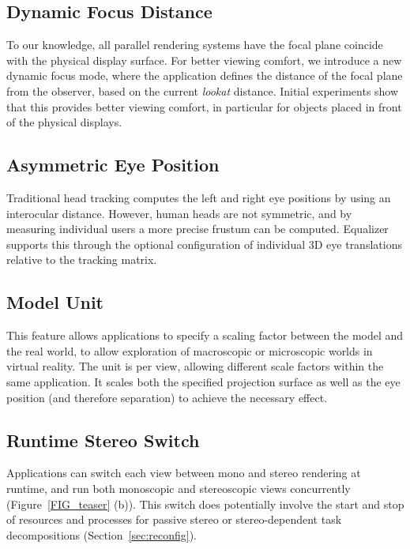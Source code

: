 \documentclass[10pt,journal,compsoc]{IEEEtran}
\newcommand{\sref}[1]{Section~\ref{#1}}
\newcommand{\fig}[1]{Figure~\ref{#1}}
\begin{document}
\subsection{Dynamic Focus Distance}

To our knowledge, all parallel rendering systems have the focal plane coincide
with the physical display surface. For better viewing comfort, we introduce a
new dynamic focus mode, where the application defines the distance of the focal
plane from the observer, based on the current \textit{lookat} distance. Initial
experiments show that this provides better viewing comfort, in particular for
objects placed in front of the physical displays.

\subsection{Asymmetric Eye Position}

Traditional head tracking computes the left and right eye positions by using an
interocular distance. However, human heads are not symmetric, and by measuring
individual users a more precise frustum can be computed. \textsf{Equalizer}
supports this through the optional configuration of individual 3D eye
translations relative to the tracking matrix.

\subsection{Model Unit}

This feature allows applications to specify a scaling factor between the model
and the real world, to allow exploration of macroscopic or microscopic worlds in
virtual reality. The unit is per view, allowing different scale factors within
the same application. It scales both the specified projection surface as well
as the eye position (and therefore separation) to achieve the necessary effect.

\subsection{Runtime Stereo Switch}

Applications can switch each view between mono and stereo rendering at runtime,
and run both monoscopic and stereoscopic views concurrently (\fig{FIG_teaser}
(b)). This switch does potentially involve the start and stop of resources and
processes for passive stereo or stereo-dependent task decompositions
(\sref{sec:reconfig}).
\end{document}
